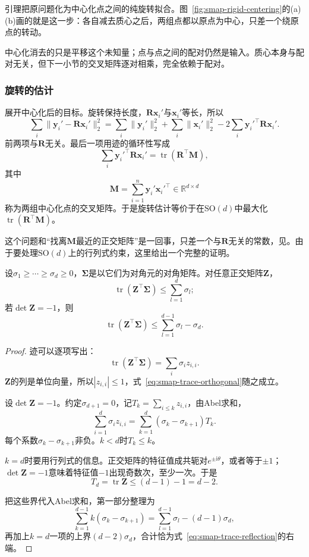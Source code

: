 引理把原问题化为中心化点之间的纯旋转拟合。图~\ref{fig:smap-rigid-centering}的(a)(b)画的就是这一步：各自减去质心之后，两组点都以原点为中心，只差一个绕原点的转动。

中心化消去的只是平移这个未知量；点与点之间的配对仍然是输入。质心本身与配对无关，但下一小节的交叉矩阵逐对相乘，完全依赖于配对。

\subsubsection{旋转的估计}
\label{sec:smap-rotation}

展开中心化后的目标。旋转保持长度，$\bm R\bm x_i'$与$\bm x_i'$等长，所以
\[
 \sum_i\lVert\bm y_i'-\bm R\bm x_i'\rVert_2^2
 =\sum_i\lVert\bm y_i'\rVert_2^2+\sum_i\lVert\bm x_i'\rVert_2^2-2\sum_i\bm y_i'^\top\bm R\bm x_i' .
\]
前两项与$\bm R$无关。最后一项用迹的循环性写成
\[
 \sum_i\bm y_i'^\top\bm R\bm x_i'=\operatorname{tr}(\bm R^\top\bm M),
\]
其中
\begin{equation}
 \bm M=\sum_{i=1}^n\bm y_i'\bm x_i'^\top\in\mathbb R^{d\times d}
 \label{eq:smap-cross-matrix}
\end{equation}
称为两组中心化点的交叉矩阵。于是旋转估计等价于在$\mathrm{SO}(d)$中最大化$\operatorname{tr}(\bm R^\top\bm M)$。

这个问题和“找离$\bm M$最近的正交矩阵”是一回事，只差一个与$\bm R$无关的常数，见。由于要处理$\mathrm{SO}(d)$上的行列式约束，这里给出一个完整的证明。

\begin{lemma}[迹的最大化]
\label{lem:smap-trace-maximum}
设$\sigma_1\geq\cdots\geq\sigma_d\geq0$，$\bm\Sigma$是以它们为对角元的对角矩阵。对任意正交矩阵$\bm Z$，
\begin{equation}
 \operatorname{tr}(\bm Z^\top\bm\Sigma)\leq\sum_{l=1}^{d}\sigma_l ;
 \label{eq:smap-trace-orthogonal}
\end{equation}
若$\det\bm Z=-1$，则
\begin{equation}
 \operatorname{tr}(\bm Z^\top\bm\Sigma)\leq\sum_{l=1}^{d-1}\sigma_l-\sigma_d .
 \label{eq:smap-trace-reflection}
\end{equation}
\end{lemma}
\begin{proof}
迹可以逐项写出：
\[
 \operatorname{tr}(\bm Z^\top\bm\Sigma)=\sum_i\sigma_iz_{i,i} .
\]
$\bm Z$的列是单位向量，所以$|z_{i,i}|\leq1$，式~\eqref{eq:smap-trace-orthogonal}随之成立。

设$\det\bm Z=-1$。约定$\sigma_{d+1}=0$，记$T_k=\sum_{i\leq k}z_{i,i}$，由Abel求和，
\[
 \sum_{i=1}^d\sigma_iz_{i,i}=\sum_{k=1}^{d}(\sigma_k-\sigma_{k+1})T_k .
\]
每个系数$\sigma_k-\sigma_{k+1}$非负。$k<d$时$T_k\leq k$。

$k=d$时要用行列式的信息。正交矩阵的特征值成共轭对$e^{\pm\mathrm i\theta}$，或者等于$\pm1$；$\det\bm Z=-1$意味着特征值$-1$出现奇数次，至少一次。于是
\[
 T_d=\operatorname{tr}\bm Z\leq(d-1)-1=d-2 .
\]

把这些界代入Abel求和，第一部分整理为
\[
 \sum_{k=1}^{d-1}k(\sigma_k-\sigma_{k+1})=\sum_{l=1}^{d-1}\sigma_l-(d-1)\sigma_d ,
\]
再加上$k=d$一项的上界$(d-2)\sigma_d$，合计恰为式~\eqref{eq:smap-trace-reflection}的右端。
\end{proof}

